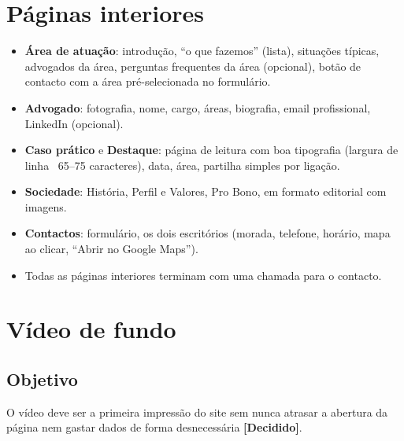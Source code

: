 \documentclass[11pt,a4paper]{article}
\newcommand{\decidido}{\textcolor{verde700}{\textbf{[Decidido]}}}
\begin{document}
\section{Páginas interiores}
\begin{itemize}
  \item \textbf{Área de atuação}: introdução, ``o que fazemos'' (lista), situações típicas, advogados da área, perguntas frequentes da área (opcional), botão de contacto com a área pré-selecionada no formulário.
  \item \textbf{Advogado}: fotografia, nome, cargo, áreas, biografia, email profissional, LinkedIn (opcional).
  \item \textbf{Caso prático} e \textbf{Destaque}: página de leitura com boa tipografia (largura de linha ~65--75 caracteres), data, área, partilha simples por ligação.
  \item \textbf{Sociedade}: História, Perfil e Valores, Pro Bono, em formato editorial com imagens.
  \item \textbf{Contactos}: formulário, os dois escritórios (morada, telefone, horário, mapa ao clicar, ``Abrir no Google Maps'').
  \item Todas as páginas interiores terminam com uma chamada para o contacto.
\end{itemize}

\section{Vídeo de fundo}\label{sec:video}

\subsection{Objetivo}
O vídeo deve ser a primeira impressão do site sem nunca atrasar a abertura da página nem gastar dados de forma desnecessária \decidido.
\end{document}
